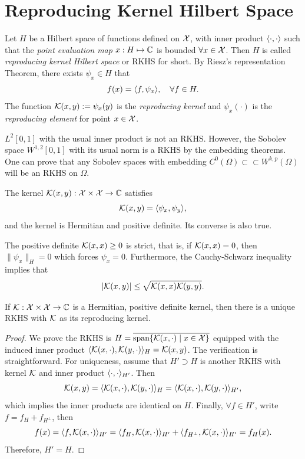\section{Reproducing Kernel Hilbert Space}
\label{Sec: 2-Rep-Ker-Hil-Spa}
Let $H$ be a Hilbert space of functions defined on $\mathcal X$, with inner product $\langle {\cdot, \cdot} \rangle$ such that the \emph{point evaluation map} $x: H\mapsto \mathbb C$ is bounded $\forall x\in \mathcal X$. Then $H$ is called \emph{reproducing kernel Hilbert space} or RKHS for short. By Riesz's representation Theorem, there exists $\psi_x\in H$ that 
\begin{equation}
    f(x) = \langle {f, \psi_x} \rangle,\quad \forall f\in H.
\end{equation}
The function $\mathcal K(x, y):=\psi_x(y)$ is the \emph{reproducing kernel} and $\psi_x(\cdot)$ is the \emph{reproducing element} for point $x\in \mathcal X$.
\begin{example}
    $L^2[0, 1]$ with the usual inner product is not an RKHS. However, the Sobolev space $W^{1, 2}[0, 1]$ with its usual norm is a RKHS by the embedding theorems. One can prove that any Sobolev spaces with embedding $C^{0}(\Omega)\subset\subset W^{k,p}(\Omega)$ will be an RKHS on $\Omega$.
\end{example}
The kernel $\mathcal K(x, y):\mathcal X\times \mathcal X\to\mathbb C$ satisfies 
\begin{equation}
    \mathcal K(x, y) = \langle {\psi_x, \psi_y} \rangle, 
\end{equation}
and the kernel is Hermitian and positive definite. Its converse is also true.
\begin{example}
    The positive definite $\mathcal K(x, x)\ge 0$ is strict, that is, if $\mathcal K(x, x) = 0$, then $\|\psi_x\|_{H} = 0$ which forces $\psi_x = 0$. Furthermore, the Cauchy-Schwarz inequality implies that 
    \begin{equation}
        | \mathcal K(x, y) |\le \sqrt{\mathcal K(x, x)\mathcal K(y, y)}. 
    \end{equation}
\end{example}
\begin{theorem}
    \label{Thm: 2-MOO-ARO}
    If $\mathcal K:\mathcal X\times \mathcal X\to\mathbb C$ is a Hermitian, positive definite kernel, then there is a unique RKHS with $\mathcal K$ as its reproducing kernel.
\end{theorem}
\begin{proof}
    We prove the RKHS is $H=\overline{\text{span}\{\mathcal K(x, \cdot) \mid x\in \mathcal X\}}$ equipped with the induced inner product $\langle {\mathcal K(x, \cdot), \mathcal K(y,\cdot)} \rangle_H = \mathcal K(x, y)$. The verification is straightforward. For uniqueness, assume that $H'\supset H$ is another RKHS with kernel $\mathcal K$ and inner product $\langle {\cdot, \cdot} \rangle_{H'}$. Then 
    \begin{equation}
        \mathcal K(x, y) = \langle {\mathcal K(x, \cdot), \mathcal K(y,\cdot)} \rangle_H = \langle {\mathcal K(x, \cdot), \mathcal K(y,\cdot)} \rangle_{H'},
    \end{equation}
    which implies the inner products are identical on $H$. Finally, $\forall f\in H'$, write $f = f_H + f_{H^{\perp}}$, then 
    \begin{equation}
        f(x) = \langle {f, \mathcal K(x, \cdot)} \rangle_{H'} = \langle {f_H, \mathcal K(x, \cdot)} \rangle_{H'}  + \langle {f_{H^\perp}, \mathcal K(x, \cdot)} \rangle_{H'} = f_H(x).
    \end{equation}
    Therefore, $H'=H$.
\end{proof}
